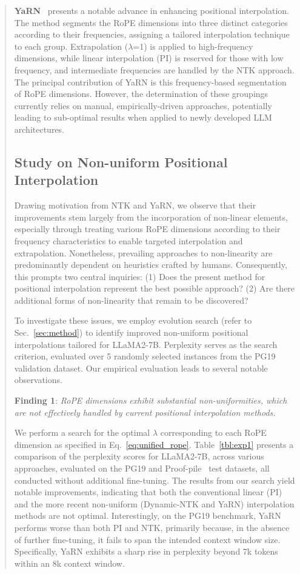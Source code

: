 \begin{abstract}
\textbf{YaRN}~\cite{yarn} presents a notable advance in enhancing positional interpolation. The method segments the RoPE dimensions into three distinct categories according to their frequencies, assigning a tailored interpolation technique to each group. Extrapolation ($\lambda$=1) is applied to high-frequency dimensions, while linear interpolation (PI) is reserved for those with low frequency, and intermediate frequencies are handled by the NTK approach. The principal contribution of YaRN is this frequency-based segmentation of RoPE dimensions. However, the determination of these groupings currently relies on manual, empirically-driven approaches, potentially leading to sub-optimal results when applied to newly developed LLM architectures.

\subsection{Study on Non-uniform Positional Interpolation}

Drawing motivation from NTK and YaRN, we observe that their improvements stem largely from the incorporation of non-linear elements, especially through treating various RoPE dimensions according to their frequency characteristics to enable targeted interpolation and extrapolation. Nonetheless, prevailing approaches to non-linearity are predominantly dependent on heuristics crafted by humans. Consequently, this prompts two central inquiries: (1) Does the present method for positional interpolation represent the best possible approach? (2) Are there additional forms of non-linearity that remain to be discovered?

To investigate these issues, we employ evolution search (refer to Sec.~\ref{sec:method}) to identify improved non-uniform positional interpolations tailored for LLaMA2-7B. Perplexity serves as the search criterion, evaluated over 5 randomly selected instances from the PG19~\cite{pg19} validation dataset. Our empirical evaluation leads to several notable observations.

\textbf{Finding 1}: \textit{RoPE dimensions exhibit substantial non-uniformities, which are not effectively handled by current positional interpolation methods.}

We perform a search for the optimal $\lambda$ corresponding to each RoPE dimension as specified in Eq.~\ref{eq:unified_rope}. Table~\ref{tbl:exp1} presents a comparison of the perplexity scores for LLaMA2-7B, across various approaches, evaluated on the PG19 and Proof-pile~\cite{proof-pile} test datasets, all conducted without additional fine-tuning. The results from our search yield notable improvements, indicating that both the conventional linear (PI) and the more recent non-uniform (Dynamic-NTK and YaRN) interpolation methods are not optimal. Interestingly, on the PG19 benchmark, YaRN performs worse than both PI and NTK, primarily because, in the absence of further fine-tuning, it fails to span the intended context window size. Specifically, YaRN exhibits a sharp rise in perplexity beyond 7k tokens within an 8k context window.


\end{abstract}
